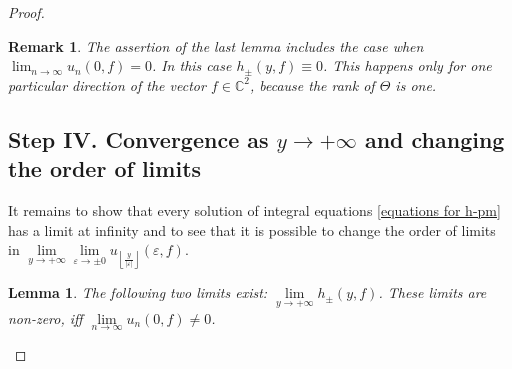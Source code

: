 \documentclass[a4paper,oneside,12pt]{amsart}
\newtheorem{lem}{Lemma}
\newtheorem{rem}{Remark}
\begin{document}
\begin{proof}
    \begin{rem}
    The assertion of the last lemma includes the case when $\lim_{n\rightarrow\infty}u_n(0,f)=0$. In this case $h_{\pm}(y,f)\equiv0$. This happens only for one particular direction of the vector $f\in\mathbb C^2$, because the rank of $\Theta$ is one.
    \end{rem}

\subsection*{Step IV. Convergence as $y\rightarrow+\infty$ and changing the order of limits}
It remains to show that every solution of integral equations \eqref{equations for h-pm} has a limit at infinity and to see that it is possible to change the order of limits in
$\lim\limits_{y\rightarrow+\infty}\lim\limits_{\varepsilon\rightarrow\pm0}
u_{\left\lfloor\frac y{|\varepsilon|}\right\rfloor}(\varepsilon,f)$.

    \begin{lem}\label{lem convergence of h-pm}
    The following two limits exist: $\lim\limits_{y\rightarrow+\infty}h_{\pm}(y,f)$. These limits are non-zero, iff $\lim\limits_{n\rightarrow\infty}u_n(0,f)\neq0$.
    \end{lem}


\end{proof}
\end{document}
